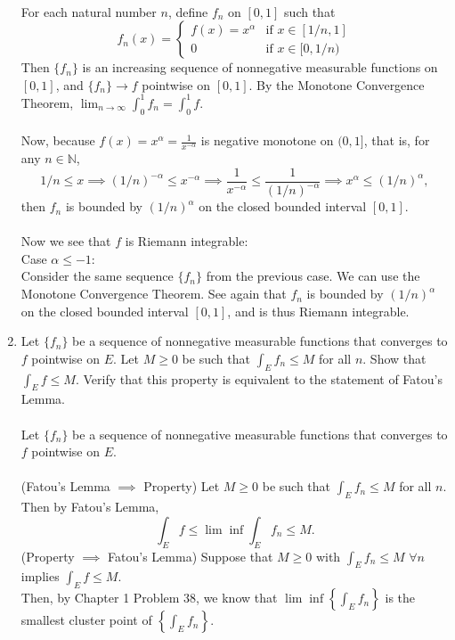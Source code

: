 \begin{enumerate}
    \\For each natural number $n$, define $f_n$ on $[0,1]$ such that
    \[
        f_n(x)=
        \begin{cases}
            f(x)=x^\alpha&\text{if }x\in[1/n,1]\\
            0&\text{if }x\in[0,1/n)
        \end{cases}
    \]
    Then $\{f_n\}$ is an increasing sequence of nonnegative measurable functions on $[0,1]$, and $\{f_n\}\to f$ pointwise on $[0,1]$.
    By the Monotone Convergence Theorem, $\lim_{n\to\infty}\int_0^1f_n=\int_0^1f$.\\
    \\Now,  because $f(x)=x^\alpha=\frac{1}{x^{-\alpha}}$ is negative monotone on $(0,1]$, that is, for any $n\in\mathbb{N}$,
    \[
        1/n\le x\implies (1/n)^{-\alpha}\le x^{-\alpha}\implies\frac{1}{x^{-\alpha}}\le\frac{1}{(1/n)^{-\alpha}}\implies x^\alpha\le(1/n)^\alpha,
    \] 
    then $f_n$ is bounded by $(1/n)^\alpha$ on the closed bounded interval $[0,1]$.\\
    \\Now we see that $f$ is Riemann integrable:
    \\Case $\alpha\le-1$:
    \\Consider the same sequence $\{f_n\}$ from the previous case. 
    We can use the Monotone Convergence Theorem.
    See again that $f_n$ is bounded by $(1/n)^\alpha$ on the closed bounded interval $[0,1]$, and is thus Riemann integrable.
    \item Let $\{f_n\}$ be a sequence of nonnegative measurable functions that converges to $f$ pointwise on $E$.
    Let $M\ge0$ be such that $\int_Ef_n\le M$ for all $n$. Show that $\int_Ef\le M$. Verify that this property is equivalent to the statement of Fatou's Lemma.\\
    \\Let $\{f_n\}$ be a sequence of nonnegative measurable functions that converges to $f$ pointwise on $E$.\\
    \\(Fatou's Lemma $\implies$ Property) Let $M\ge0$ be such that $\int_Ef_n\le M$ for all $n$.
    \\Then by Fatou's Lemma,
    \[
        \int_Ef\le\lim\inf\int_Ef_n\le M.
    \]
    (Property $\implies$ Fatou's Lemma) Suppose that $M\ge0$ with $\int_Ef_n\le M$ $\forall n$ implies $\int_Ef\le M$.
    \\Then, by Chapter 1 Problem 38, we know that $\lim\inf\left\{\int_Ef_n\right\}$ is the smallest cluster point of $\left\{\int_Ef_n\right\}$.

\end{enumerate}
